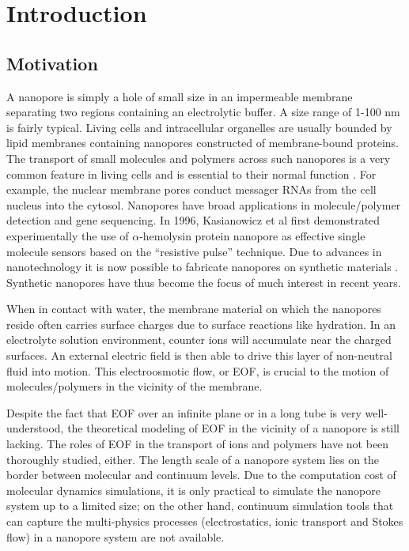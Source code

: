 \chapter{Introduction}\label{chpt:intro}
\section{Motivation}\label{sec:intro-motiv}
A nanopore is simply a hole of small size in an impermeable membrane separating two regions containing an electrolytic buffer. A size range of 1-100 nm is fairly typical. Living cells and intracellular organelles are usually bounded by lipid membranes containing nanopores constructed of membrane-bound proteins. The transport of small molecules and polymers across such nanopores is a very common feature in living cells and is essential to their normal function \cite{Alberts,Pfanner_90,Matouschek,Martin,Kunkele}. For example, the nuclear membrane pores conduct messager RNAs from the cell nucleus into the cytosol. Nanopores have broad applications in molecule\//polymer detection and gene sequencing. In 1996,  Kasianowicz \cite{Kasianowicz1996} et al first demonstrated experimentally the use of $\alpha$-hemolysin protein  nanopore as effective single molecule sensors based on the ``resistive pulse'' technique. Due to advances in nanotechnology it is now possible to fabricate nanopores on synthetic materials \cite{li_nat_mat03,storm_physRevE05,storm_nanolett05,dekker_nano_lett06,bayley_nanotechnology_2010,Garaj2010,Schneider2010,Merchant2010}. Synthetic nanopores have thus become the focus of much interest in recent years.

When in contact with water, the membrane material on which the nanopores reside often carries surface charges due to surface reactions like hydration. In an electrolyte solution environment, counter ions will accumulate near the charged surfaces. An external electric field is then able to drive this layer of non-neutral fluid into motion. This electroosmotic flow, or EOF, is crucial to the motion of molecules\//polymers in the vicinity of the membrane. 

Despite the fact that EOF over an infinite plane or in a long tube is very well-understood, the theoretical modeling of EOF in the vicinity of a nanopore is still lacking. The roles of EOF in the transport of ions and polymers have not been thoroughly studied, either. The length scale of a nanopore system lies on the border between molecular and continuum levels. Due to the computation cost of molecular dynamics simulations, it is only practical to simulate the nanopore system up to a limited size; on the other hand, continuum simulation tools that can capture the multi-physics processes (electrostatics, ionic transport and Stokes flow) in a nanopore system are not available. 

